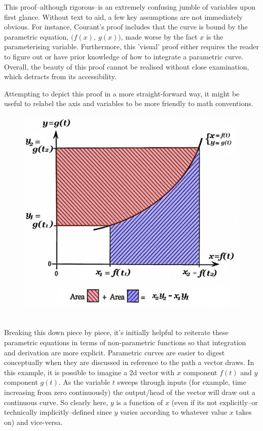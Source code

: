 \documentclass[11pt,a4paper]{article}
\begin{document}
This proof--although rigorous--is an extremely confusing jumble of variables upon first glance.  Without text to aid, a few key assumptions are not immediately obvious. For instance, Courant's proof includes that the curve is bound by the parametric equation, $ \big( f(x), \ g(x) \big) $, made worse by the fact $x$ is the parameterising variable.  Furthermore, this 'visual' proof either requires the reader to figure out or have prior knowledge of how to integrate a parametric curve. Overall, the beauty of this proof cannot be realised without close examination, which detracts from its accessibility.
\pagebreak

Attempting to depict this proof in a more straight-forward way, it might be useful to relabel the axis and variables to be more friendly to math conventions. \\
\begin{figure}[h]
\begin{center}
\includegraphics[scale=.4]{modified proof of ibp} 
\end{center}
\end{figure} \\
Breaking this down piece by piece, it's initially helpful to reiterate these parametric equations in terms of non-parametric functions so that integration and derivation are more explicit. Parametric curves are easier to digest conceptually when they are discussed in reference to the path a vector draws. In this example, it is possible to imagine a 2d vector with $x$ component $f(t)$ and $y$ component $g(t)$.  As the variable $t$ sweeps through inputs (for example, time increasing from zero continuously) the output/head of the vector will draw out a continuous curve. So clearly here,  $y$ is a function of $x$ (even if its not explicitly--or technically implicitly--defined since $y$ varies according to whatever value $x$ takes on) and vice-versa.
\end{document}
